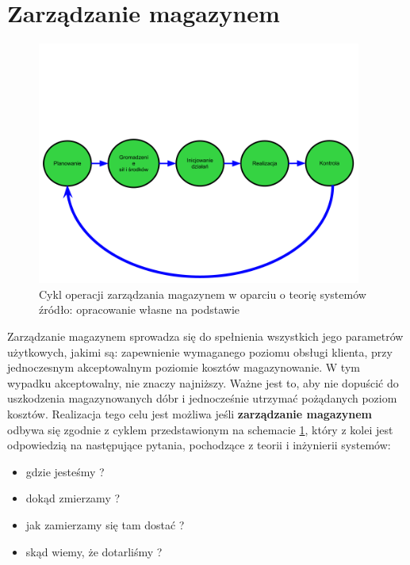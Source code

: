 \section{Zarządzanie magazynem}
	\begin{figure}[h]
		\centering
		\includegraphics[width=0.95\textwidth]{images/warehouse_management_algorithm_2}
		\caption[Cykl operacji zarządzania magazynem]{
			Cykl operacji zarządzania magazynem w oparciu o teorię systemów \\
			źródło: opracowanie własne na podstawie \cite{PZMW}
		}
		\label{fig:warehouse_management_algorithm}
	\end{figure}
	Zarządzanie magazynem sprowadza się do spełnienia wszystkich jego parametrów użyt\-kowych, jakimi są:
	zapewnienie wymaganego poziomu obsługi klienta, przy jednoczesnym akceptowalnym poziomie kosztów magazynowanie.
	W tym wypadku akceptowalny, nie znaczy najniższy. Ważne jest to, aby nie dopuścić do uszkodzenia magazynowanych
	dóbr i jednocześnie utrzymać pożądanych poziom kosztów.
	Realizacja tego celu jest możliwa jeśli \textbf{zarządzanie magazynem} odbywa się zgodnie z cyklem
	przedstawionym na schemacie \ref{fig:warehouse_management_algorithm}, który z kolei jest odpowiedzią na
	następujące pytania, pochodzące z teorii i inżynierii systemów:
	\begin{itemize}
		\item gdzie jesteśmy ?
		\item dokąd zmierzamy ?
		\item jak zamierzamy się tam dostać ?
		\item skąd wiemy, że dotarliśmy ?
	\end{itemize}
	
